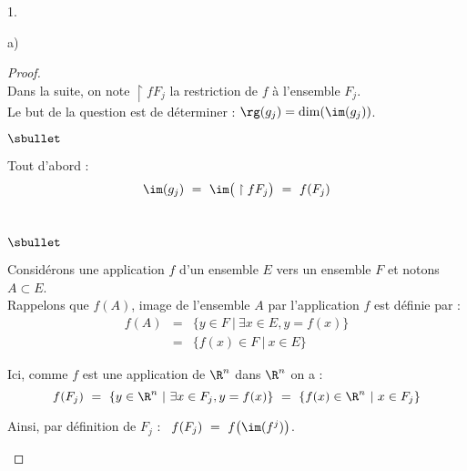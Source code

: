 \documentclass[11pt]{article}%
\begin{document}
\begin{noliste}{1.}
\begin{noliste}{a)}
    \begin{proof}~\\%
      Dans la suite, on note $\restriction{f}{F_j}$ la restriction de
      $f$ à l'ensemble $F_j$.\\
      Le but de la question est de déterminer : $\rg(g_j) = \dim(\im(g_j))$.
      \begin{noliste}{$\sbullet$}
      \item Tout d'abord :
        \[
        \im(g_j) \ = \ \im\big( \restriction{f}{F_j} \big) \ = \
        f(F_j)
        \]~\\[-1cm]
        \begin{remarkL}{.98}%
          \begin{noliste}{$\sbullet$}
          \item Considérons une application $f$ d'un ensemble $E$ vers
            un ensemble $F$ et notons $A \subset E$.\\
            Rappelons que $f(A)$, image de l'ensemble $A$ par
            l'application $f$ est définie par :
            \[
            \begin{array}{rcl}
              f(A) & = & \{ y \in F \ | \ \exists x \in E, y = f(x) \}
              \\[.2cm]
              & = & \{ f(x) \in F \ | \ x \in E \}
            \end{array}
            \]
          \item Ici, comme $f$ est une application de $\R^n$ dans
            $\R^n$ on a :
            \[
            f(F_j) \ = \ \{ y \in \R^n \ | \ \exists x \in F_j, y =
            f(x) \} \ = \ \{ f(x) \in \R^n \ | \ x \in F_j \}
            \]
          \end{noliste}
        \end{remarkL}

      \item Ainsi, par définition de $F_j$ : \ $f(F_j) \ = \ f\big(
        \im(f^j) \big)$.        


\end{noliste}
\end{proof}
\end{noliste}
\end{noliste}
\end{document}
